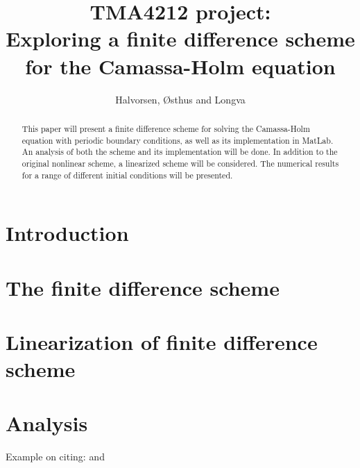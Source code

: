 \documentclass{article}
\title{TMA4212 project: \\ Exploring a finite difference scheme for the Camassa-Holm equation}
\author{Halvorsen, Østhus and Longva}
\begin{document}
\maketitle

\begin{abstract}
This paper will present a finite difference scheme for solving the Camassa-Holm equation with periodic boundary conditions, as well as its implementation in MatLab. An analysis of both the scheme and its implementation will be done. In addition to the original nonlinear scheme, a linearized scheme will be considered. The numerical results for a range of different initial conditions will be presented. 
\end{abstract}

\newpage

\section*{Introduction}


\newpage

\section*{The finite difference scheme}


\newpage

\section*{Linearization of finite difference scheme}


\newpage

\section*{Analysis}


Example on citing: \cite{holden2006convergence} and \cite{dahlby2007geometric}
{}

\end{document}
